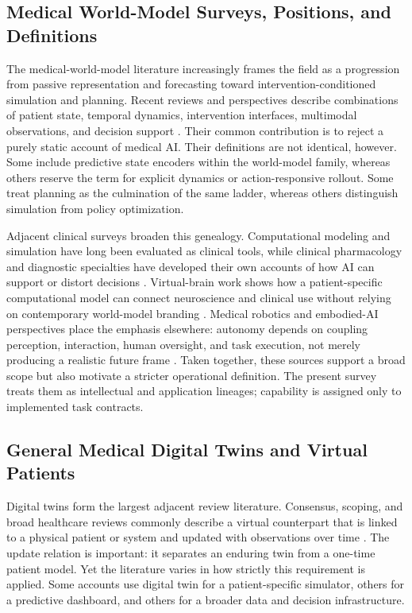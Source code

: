 \subsection{Medical World-Model Surveys, Positions, and Definitions}

The medical-world-model literature increasingly frames the field as a progression from passive representation and forecasting toward intervention-conditioned simulation and planning. Recent reviews and perspectives describe combinations of patient state, temporal dynamics, intervention interfaces, multimodal observations, and decision support \citep{Saeed2026MedicalWorldModel,Liu2026MedicalWorldModelsReview,Feng2026StaticRiskDynamic,Wang2026TowardsBiomedicalWorldModels}. Their common contribution is to reject a purely static account of medical AI. Their definitions are not identical, however. Some include predictive state encoders within the world-model family, whereas others reserve the term for explicit dynamics or action-responsive rollout. Some treat planning as the culmination of the same ladder, whereas others distinguish simulation from policy optimization.

Adjacent clinical surveys broaden this genealogy. Computational modeling and simulation have long been evaluated as clinical tools, while clinical pharmacology and diagnostic specialties have developed their own accounts of how AI can support or distort decisions \citep{Johnson2023potentialpitfallsartificial,Walter2021Howartificialintelligence,Lesage2023Mappingusecomputational}. Virtual-brain work shows how a patient-specific computational model can connect neuroscience and clinical use without relying on contemporary world-model branding \citep{Wang2024VirtualBrainTwins}. Medical robotics and embodied-AI perspectives place the emphasis elsewhere: autonomy depends on coupling perception, interaction, human oversight, and task execution, not merely producing a realistic future frame \citep{Navab2026DyadicPartnershipDp,Liu2025ScreensScenesSurvey}. Taken together, these sources support a broad scope but also motivate a stricter operational definition. The present survey treats them as intellectual and application lineages; capability is assigned only to implemented task contracts.

\subsection{General Medical Digital Twins and Virtual Patients}

Digital twins form the largest adjacent review literature. Consensus, scoping, and broad healthcare reviews commonly describe a virtual counterpart that is linked to a physical patient or system and updated with observations over time \citep{Sun2022DigitalTwinMedicine,Cellina2023DigitalTwinsNew,Wang2023Opportunitieschallengesdigital,Vall_e2023Digitaltwinhealthcare,Sun2023Digitaltwinhealthcare,Katsoulakis2024Digitaltwinshealth}. The update relation is important: it separates an enduring twin from a one-time patient model. Yet the literature varies in how strictly this requirement is applied. Some accounts use digital twin for a patient-specific simulator, others for a predictive dashboard, and others for a broader data and decision infrastructure.

